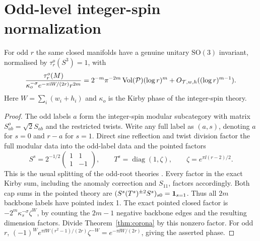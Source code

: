 \appendix
\section{Odd-level integer-spin normalization}
\begin{corollary}\label{cor:so}
For odd \(r\) the same closed manifolds have a genuine unitary \(\mathrm{SO}(3)\) invariant, normalised by \(\tau_r^o(S^3)=1\), with
\[
 \frac{\tau_r^o(M)}{\kappa_o^{-\sigma}e^{-\pi\mathrm i W/(2r)}r^{2m}}
 =2^{-m}\pi^{-2m}\operatorname{Vol}(\mathcal P)(\log r)^m
     +O_{\mathcal T,w,h}((\log r)^{m-1}).
\]
Here \(W=\sum_i(w_i+h_i)\) and \(\kappa_o\) is the Kirby phase of the integer-spin theory.
\end{corollary}
\begin{proof}
The odd labels \(a\) form the integer-spin modular subcategory with matrix \(S^o_{ab}=\sqrt{2}S_{ab}\) and the restricted twists. Write any full label as \((a,s)\), denoting \(a\) for \(s=0\) and \(r-a\) for \(s=1\). Direct sine reflection and twist division factor the full modular data into the odd-label data and the pointed factors
\[
 S^s=2^{-1/2}\begin{pmatrix}1&1\\1&-1\end{pmatrix},
 \qquad T^s=\operatorname{diag}(1,\zeta),\qquad
 \zeta=e^{\pi\ii(r-2)/2}.
\]
This is the usual splitting of the odd-root theories \cite{KM}. Every factor in the exact Kirby sum, including the anomaly correction and \(S_{11}\), factors accordingly. Both cap sums in the pointed theory are \((S^s(T^s)^{\pm2}S^s)_{s0}=\mathbf 1_{s=1}\). Thus all \(2m\) backbone labels have pointed index 1. The exact pointed closed factor is \(-2^m\kappa_s^{-\sigma}\zeta^W\), by counting the \(2m-1\) negative backbone edges and the resulting dimension factors. Divide Theorem~\ref{thm:corona} by this nonzero factor. For odd \(r\), \((-1)^W e^{\pi\ii W(r^2-1)/(2r)}\zeta^{-W}=e^{-\pi\ii W/(2r)}\), giving the asserted phase.
\end{proof}

